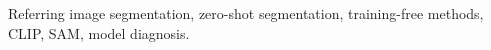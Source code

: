 \documentclass[journal]{IEEEtran}
\begin{document}
\begin{IEEEkeywords}
Referring image segmentation, zero-shot segmentation, training-free methods,
CLIP, SAM, model diagnosis.
\end{IEEEkeywords}











\end{document}
